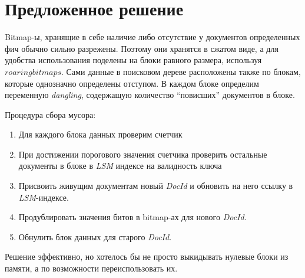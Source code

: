 \newpage
\section{Предложенное решение}

Bitmap-ы, хранящие в себе наличие либо отсутствие у документов определенных фич обычно сильно разрежены.
Поэтому они хранятся в сжатом виде, а для удобства использования поделены на блоки равного
размера, используя \textit{$roaring bitmaps$}. Сами данные в поисковом дереве расположены также по блокам,
которые однозначно определены отступом. В каждом блоке определим переменную \textit{dangling},
содержащую количество “повисших” документов в блоке. 

Процедура сбора мусора:
\begin{enumerate}
    \item Для каждого блока данных проверим счетчик
    \item При достижении порогового значения счетчика проверить остальные документы в блоке в \textit{LSM}
    индексе на валидность ключа
    \item Присвоить живущим документам новый \textit{DocId} и обновить на него ссылку в \textit{LSM}-индексе.
    \item Продублировать значения битов в bitmap-ах для нового \textit{DocId}.
    \item Обнулить блок данных для старого \textit{DocId}.
\end{enumerate}

Решение эффективно, но хотелось бы не просто выкидывать нулевые блоки из памяти, а по возможности переиспользовать их.
